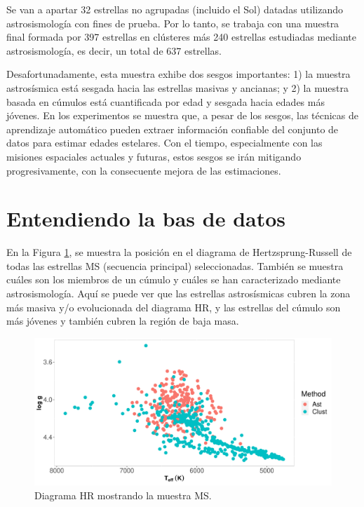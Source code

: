 Se van a apartar 32 estrellas no agrupadas (incluido el Sol) datadas utilizando astrosismología con fines de prueba. Por lo tanto, se trabaja con una muestra final formada por 397 estrellas en clústeres más 240 estrellas estudiadas mediante astrosismología, es decir, un total de 637 estrellas.

Desafortunadamente, esta muestra exhibe dos sesgos importantes: 1) la muestra astrosísmica está sesgada hacia las estrellas masivas y ancianas; y 2) la muestra basada en cúmulos está cuantificada por edad y sesgada hacia edades más jóvenes. En los experimentos se muestra que, a pesar de los sesgos, las técnicas de aprendizaje automático pueden extraer información confiable del conjunto de datos para estimar edades estelares. Con el tiempo, especialmente con las misiones espaciales actuales y futuras, estos sesgos se irán mitigando progresivamente, con la consecuente mejora de las estimaciones.


\section{Entendiendo la bas de datos}

En la Figura \ref{Fig:HR_select}, se muestra la posición en el diagrama de Hertzsprung-Russell de todas las estrellas MS (secuencia principal) seleccionadas. También se muestra cuáles son los miembros de un cúmulo y cuáles se han caracterizado mediante astrosismología. Aquí se puede ver que las estrellas astrosísmicas cubren la zona más masiva y/o evolucionada del diagrama HR, y las estrellas del cúmulo son más jóvenes y también cubren la región de baja masa.

\begin{figure}[H]
\begin{center}
\includegraphics[width=0.9\linewidth]{Figuras/sampling_MS_astro_clust_embedded.pdf}
\end{center}
\caption{Diagrama HR mostrando la muestra MS.}
 \label{Fig:HR_select}
\end{figure}

